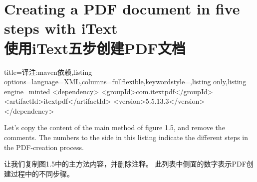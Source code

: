 \setcounter{chapter}{1}
\setcounter{section}{2}
\section{Creating a PDF document in five steps with iText\\使用iText五步创建PDF文档}

\begin{tcblisting}{title={译注:maven依赖},listing options={language=XML,columns=fullflexible,keywordstyle=\color{red}},listing only,listing engine=minted}
<dependency>
    <groupId>com.itextpdf</groupId>
    <artifactId>itextpdf</artifactId>
    <version>5.5.13.3</version>
</dependency>
\end{tcblisting}

Let’s copy the content of the main method of figure 1.5, and remove the comments.
The numbers to the side in this listing indicate the different steps in the PDF-creation process.

让我们复制图1.5中的主方法内容，并删除注释。
此列表中侧面的数字表示PDF创建过程中的不同步骤。

